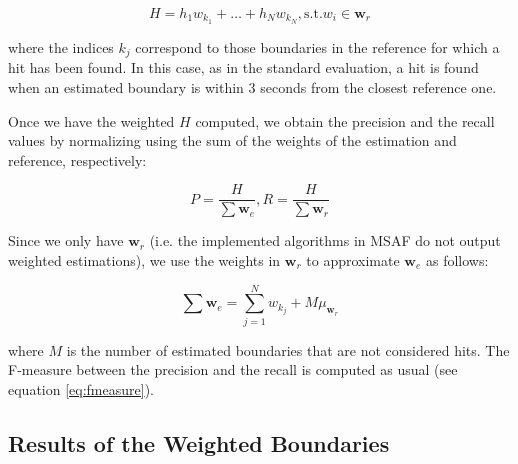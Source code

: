 \documentclass{article}
\begin{document}
\begin{equation}
  H = h_1 w_{k_1} + \ldots + h_N w_{k_N}, \mbox{s.t.} w_i \in \textbf{w}_r
\end{equation}

where the indices $k_j$ correspond to those boundaries in the reference for which a hit has been found.
In this case, as in the standard evaluation, a hit is found when an estimated boundary is within 3 seconds from the closest reference one.

Once we have the weighted $H$ computed, we obtain the precision and the recall values by normalizing using the sum of the weights of the estimation and reference, respectively:

\begin{equation}
  P = \frac{H}{\sum \textbf{w}_e} , R = \frac{H}{\sum \textbf{w}_r}
\end{equation}

Since we only have $\textbf{w}_r$ (i.e. the implemented algorithms in MSAF do not output weighted estimations), we use the weights in $\textbf{w}_r$ to approximate $\textbf{w}_e$ as follows:

\begin{equation}
  \sum \textbf{w}_e = \sum_{j = 1}^{N} w_{k_j} + M \mu_{\textbf{w}_r}
\end{equation}

where $M$ is the number of estimated boundaries that are not considered hits.
The F-measure between the precision and the recall is computed as usual (see equation \ref{eq:fmeasure}).







\subsection{Results of the Weighted Boundaries}
\end{document}
